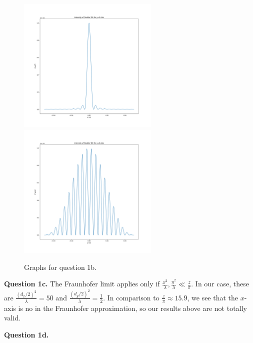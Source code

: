 \documentclass[letterpaper, reqno,11pt]{article}
\begin{document}
\begin{figure}[htpb]
    \centering
    \includegraphics[width=0.6\textwidth]{q1x}
    \includegraphics[width=0.6\textwidth]{q1y}
    \caption{Graphs for question 1b.}
    \label{fig:q1b}
\end{figure}

{\medskip\noindent\bf Question 1c.} The Fraunhofer limit applies only if $\frac{x^2}{\lambda}, \frac{y^2}{\lambda} \ll \frac{z}{\pi}$. In our case, these are $\frac{(d_x/2)^2}{\lambda}=50$ and $\frac{(d_y /2)^2}{\lambda}=\frac{1}{2}$. In comparison to $\frac{z}{\pi}\approx 15.9$, we see that the $x$-axis is no in the Fraunhofer approximation, so our results above are not totally valid.

{\medskip\noindent\bf Question 1d.} 


\end{document}
